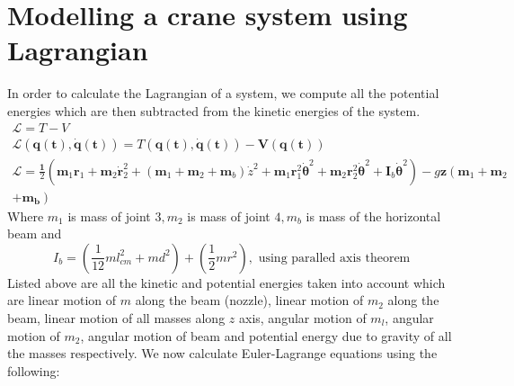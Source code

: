 \documentclass{UoNMCHA}
\numberwithin{equation}{section}
\begin{document}
\section{Modelling a crane system using Lagrangian}

In order to calculate the Lagrangian of a system, we compute all the potential energies which are then
subtracted from the kinetic energies of the system.
$$
\begin{array}{c}
\mathcal{L}=T-V \\
\mathcal{L}(\boldsymbol{q}(\boldsymbol{t}), \dot{\boldsymbol{q}}(\boldsymbol{t}))=T(\boldsymbol{q}(\boldsymbol{t}), \dot{\boldsymbol{q}}(\boldsymbol{t}))-\boldsymbol{V}(\boldsymbol{q}(\boldsymbol{t})) \\
\mathcal{L}=\frac{\mathbf{1}}{2}\left(\boldsymbol{m}_{1} \boldsymbol{r}_{1}+\boldsymbol{m}_{2} \dot{\boldsymbol{r}}_{2}^{2}+\left(\boldsymbol{m}_{1}+\boldsymbol{m}_{2}+\boldsymbol{m}_{b}\right) \dot{z}^{2}+\boldsymbol{m}_{1} \boldsymbol{r}_{1}^{2} \dot{\boldsymbol{\theta}}^{2}+\boldsymbol{m}_{2} \boldsymbol{r}_{2}^{2} \dot{\boldsymbol{\theta}}^{2}+\boldsymbol{I}_{b} \dot{\boldsymbol{\theta}}^{2}\right)-g \mathbf{z}\left(\boldsymbol{m}_{1}+\boldsymbol{m}_{2}\right. \\
\left.+\boldsymbol{m}_{\boldsymbol{b}}\right)
\end{array}
$$
Where $m_{1}$ is mass of joint $3, m_{2}$ is mass of joint $4, m_{b}$ is mass of the horizontal beam and
$$
I_{b}=\left(\frac{1}{12} m l_{c m}^{2}+m d^{2}\right)+\left(\frac{1}{2} m r^{2}\right), \text { using paralled axis theorem }
$$
Listed above are all the kinetic and potential energies taken into account which are linear motion of $m$
along the beam (nozzle), linear motion of $m_{2}$ along the beam, linear motion of all masses along $z$ axis,
angular motion of $m_{l}$, angular motion of $m_{2}$, angular motion of beam and potential energy due to
gravity of all the masses respectively.
We now calculate Euler-Lagrange equations using the following:
\end{document}
